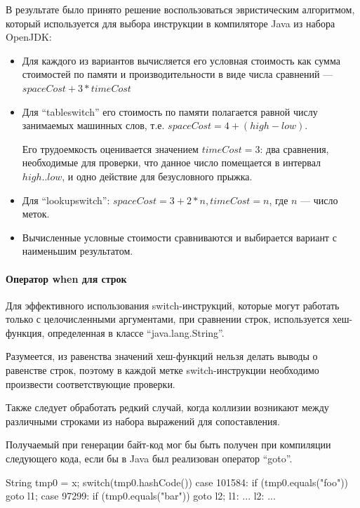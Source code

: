 В результате было принято решение воспользоваться эвристическим алгоритмом, который используется
для выбора инструкции в компиляторе Java из набора OpenJDK:
\begin{itemize}
    \item Для каждого из вариантов вычисляется его условная стоимость как сумма стоимостей
    по памяти и производительности в виде числа сравнений --- $spaceCost + 3 * timeCost$

    \item Для ``tableswitch'' его стоимость по памяти полагается равной числу занимаемых машинных
    слов, т.е. $spaceCost = 4 + (high - low)$.

    Его трудоемкость оценивается значением $timeCost = 3$: два сравнения, необходимые для проверки,
    что данное число помещается в интервал $high..low$, и одно действие для безусловного прыжка.

    \item Для ``lookupswitch'': $spaceCost = 3 + 2 * n, timeCost = n$, где $n$ --- число меток.

    \item Вычисленные условные стоимости сравниваются и выбирается вариант с наименьшим
    результатом.
\end{itemize}

\paragraph{Оператор when для строк}
Для эффективного использования switch-инструкций, которые могут работать только с целочисленными
аргументами, при сравнении строк, используется хеш-функция, определенная в классе
``java.lang.String''.

Разумеется, из равенства значений хеш-функций нельзя делать выводы о равенстве строк,
поэтому в каждой метке switch-инструкции необходимо произвести соответствующие проверки.

Также следует обработать редкий случай, когда коллизии возникают между различными строками
из набора выражений для сопоставления.

Получаемый при генерации байт-код мог бы быть получен при компиляции следующего кода,
если бы в Java был реализован оператор ``goto''.
\begin{pyglist}[language=java]
String tmp0 = x;
switch(tmp0.hashCode()) {
    case 101584: if (tmp0.equals("foo")) { goto l1; }
    case 97299: if (tmp0.equals("bar")) { goto l2; }
}
l1: ...
l2: ...
\end{pyglist}

